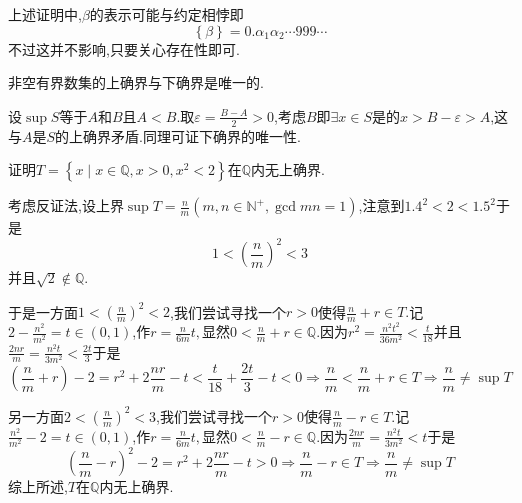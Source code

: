 \begin{red}
    \begin{remark}
        上述证明中,$\beta$的表示可能与约定相悖即\[
        \left\{\beta\right\}=0.\alpha_1\alpha_2\cdots999\cdots
        \]不过这并不影响,只要关心存在性即可.
    \end{remark}
\end{red}
\begin{formal}
    \begin{theorem}[确界的唯一性]\label{thm:确界的唯一性}
        非空有界数集的上确界与下确界是唯一的.
    \end{theorem}
    \begin{Proof}
        设$\sup S$等于$A$和$B$且$A<B$.取$\displaystyle \varepsilon=\frac{B-A}{2}>0$,考虑$B$即$\exists x\in S$是的$x>B-\varepsilon>A$,这与$A$是$S$的上确界矛盾.同理可证下确界的唯一性.
    \end{Proof}
\end{formal}
\begin{brown}
    \begin{example}
        证明$\displaystyle T=\left\{
            x\mid x\in\mathbb{Q},x>0,x^2<2
        \right\}$在$\mathbb{Q}$内无上确界.
    \end{example}
    \begin{Proof}
        考虑反证法,设上界$\displaystyle \sup T=\frac{n}{m}\left(m,n\in\mathbb{N}^+,\gcd{m}{n}=1\right)$,注意到$1.4^2<2<1.5^2$于是\[
        1<\left(
            \frac{n}{m}
        \right)^2<3
        \]并且$\sqrt{2}\notin \mathbb{Q}.$
        
        于是一方面$\displaystyle 1<\left(\frac{n}{m}\right)^2<2$,我们尝试寻找一个$r>0$使得$\displaystyle \frac{n}{m}+r\in T.$记$\displaystyle 2-\frac{n^2}{m^2}=t\in\left(0,1\right)$,作$\displaystyle r=\frac{n}{6m}t,$显然$\displaystyle 0<\frac{n}{m}+r\in\mathbb{Q}.$因为$\displaystyle r^2=\frac{n^2t^2}{36m^2}<\frac{t}{18}$并且$\displaystyle \frac{2nr}{m}=\frac{n^2t}{3m^2}<\frac{2t}{3}$于是\[
        \left(
            \frac{n}{m}+r
        \right)-2=r^2+2\frac{nr}{m}-t<\frac{t}{18}+\frac{2t}{3}-t<0\Longrightarrow
        \frac{n}{m}<\frac{n}{m}+r\in T\Longrightarrow \frac{n}{m}\neq\sup T
        \]

        另一方面$\displaystyle 2<\left(\frac{n}{m}\right)^2<3$,我们尝试寻找一个$r>0$使得$\displaystyle \frac{n}{m}-r\in T.$记$\displaystyle \frac{n^2}{m^2}-2=t\in\left(0,1\right)$,作$\displaystyle r=\frac{n}{6m}t,$显然$\displaystyle 0<\frac{n}{m}-r\in\mathbb{Q}.$因为$\displaystyle \frac{2nr}{m}=\frac{n^2t}{3m^2}<t$于是\[
        \left(
            \frac{n}{m}-r
        \right)^2-2=r^2+2\frac{nr}{m}-t>0\Longrightarrow
        \frac{n}{m}-r\in T\Longrightarrow \frac{n}{m}\neq\sup T
        \]综上所述,$\displaystyle T$在$\mathbb{Q}$内无上确界.
    \end{Proof}
\end{brown}
\newpage

